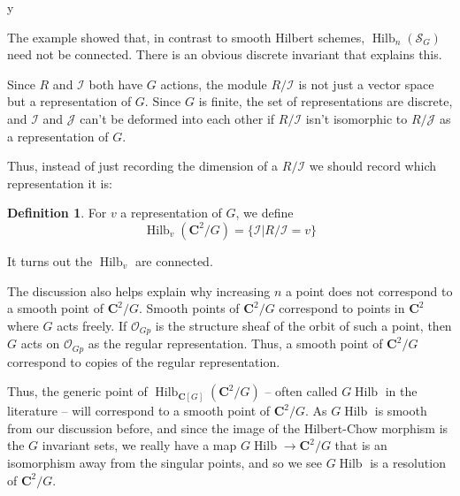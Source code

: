 y\documentclass{amsart}[12pt]
\theoremstyle{definition}
\newtheorem{definition}[dummy]{Definition}
\newcommand{\C}{\mathbf{C}}
\newcommand{\Sur}{\mathcal{S}}
\DeclareMathOperator{\Hilb}{Hilb}
\begin{document}
The example showed that, in contrast to smooth Hilbert schemes, $\Hilb_n(\Sur_G)$ need not be connected.  There is an obvious discrete invariant that explains this.

 Since $R$ and $\mathcal{I}$ both have $G$ actions, the module $R/\mathcal{I}$ is not just a vector space but a representation of $G$.  Since $G$ is finite, the set of representations are discrete, and $\mathcal{I}$ and $\mathcal{J}$ can't be deformed into each other if $R/\mathcal{I}$ isn't isomorphic to $R/\mathcal{J}$ as a representation of $G$.  

Thus, instead of just recording the dimension of a $R/\mathcal{I}$ we should record which representation it is:

\begin{definition}
For $v$ a representation of $G$, we define
$$\Hilb_v(\C^2/G)=\{\mathcal{I}|R/\mathcal{I}=v\}$$
\end{definition}

It turns out the $\Hilb_v$ are connected.  





The discussion also helps explain why increasing $n$ a point does not correspond to a smooth point of $\C^2/G$.  Smooth points of $\C^2/G$ correspond to points in $\C^2$ where $G$ acts freely.  If $\mathcal{O}_{Gp}$ is the structure sheaf of the orbit of such a point, then $G$ acts on $\mathcal{O}_{Gp}$ as the regular representation.  Thus, a smooth point of $\C^2/G$ correspond to copies of the regular representation.

Thus, the generic point of $\Hilb_{\C[G]}({\C^2/G})$ -- often called $G\Hilb$ in the literature -- will correspond to a smooth point of $\C^2/G$.  As $G\Hilb$ is smooth from our discussion before, and since the image of the Hilbert-Chow morphism is the $G$ invariant sets, we really have a map $G\Hilb\to \C^2/G$ that is an isomorphism away from the singular points, and so we see $G\Hilb$ is a resolution of $\C^2/G$. 

\begin{center}
\end{center}
\end{document}
